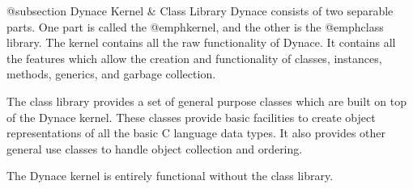@subsection Dynace Kernel & Class Library
Dynace consists of two separable parts.  One part is called the @emph{kernel},
and the other is the @emph{class library}.  The kernel contains all the
raw functionality of Dynace.  It contains all the features which allow the
creation and functionality of classes, instances, methods, generics, and
garbage collection.  

The class library provides a set of general purpose classes which are
built on top of the Dynace kernel.  These classes provide basic facilities
to create object representations of all the basic C language data types.
It also provides other general use classes to handle object collection
and ordering.

The Dynace kernel is entirely functional without the class library.

